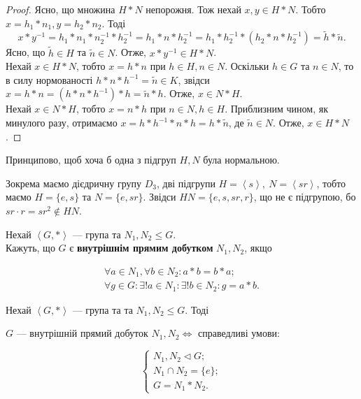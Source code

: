 \documentclass{math_library}
\begin{document}
\begin{proof}
Ясно, що множина $H*N$ непорожня. Тож нехай $x,y \in H*N$. Тобто $x = h_1*n_1, y = h_2*n_2$. Тоді \[
x*y^{-1} = h_1*n_1*n_2^{-1}*h_2^{-1} = h_1*n*h_2^{-1} = h_1*h_2^{-1} *(h_2*n*h_2^{-1})= \tilde{h}*\tilde{n}.
\]
Ясно, що $\tilde{h} \in H$ та $\tilde{n} \in N$. Отже, $x*y^{-1} \in H*N$.
\bigskip \\
Нехай $x \in H*N$, тобто $x = h*n$ при $h \in H, n \in N$. Оскільки $h \in G$ та $n \in N$, то в силу нормованості $h*n*h^{-1} = \tilde{n} \in K$, звідси $x = h*n = (h*n*h^{-1})*h = \tilde{n}*h$. Отже, $x \in N*H$.\\
Нехай $x \in N*H$, тобто $x = n*h$ при $n \in N, h \in H$. Приблизним чином, як минулого разу, отримаємо $x = h*h^{-1}*n*h = h*\tilde{n}$, де $\tilde{n} \in N$. Отже, $x \in H*N$.
\end{proof}

\begin{remark}
Принципово, щоб хоча б одна з підгруп $H,N$ була нормальною.
\end{remark}

\begin{example}
Зокрема маємо дієдричну групу $D_3$, дві підгрупи $H = \left<s\right>,\ N = \left<sr\right>$, тобто маємо $H = \{e,s\}$ та $N = \{e, sr\}$. Звідси $HN = \{e,s,sr,r\}$, що не є підгрупою, бо $sr \cdot r = sr^2 \notin HN$.
\end{example}

\begin{definition}
Нехай $\left<G, *\right>$ --- група та $N_1,N_2 \leq G$.\\
Кажуть, що $G$ є \textbf{внутрішнім прямим добутком} $N_1,N_2$, якщо

\begin{align*}
\forall a \in N_1, \forall b \in N_2: a*b = b*a; \\
\forall g \in G: \exists !a \in N_1: \exists !b \in N_2: g = a*b.
\end{align*}
\end{definition}

\begin{theorem}
Нехай $\left<G, *\right>$  --- група та та $N_1,N_2 \leq G$. Тоді
\begin{center}
$G$ --- внутрішній прямий добуток $N_1,N_2 \iff$ справедливі умови:
\end{center}
\begin{equation*}
\label{internal_product}
\begin{cases} N_1, N_2 \triangleleft G; \\ N_1 \cap N_2 = \{e\}; \\ G = N_1*N_2.
\end{cases}
\end{equation*}
\end{theorem}
\end{document}
